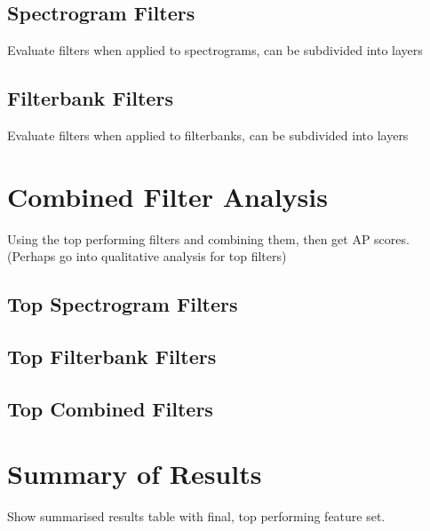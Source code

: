 \subsection{Spectrogram Filters}

Evaluate filters when applied to spectrograms, can be subdivided into layers

\subsection{Filterbank Filters}

Evaluate filters when applied to filterbanks, can be subdivided into layers

\section{Combined Filter Analysis}

Using the top performing filters and combining them, then get AP scores.
(Perhaps go into qualitative analysis for top filters)

\subsection{Top Spectrogram Filters}

\subsection{Top Filterbank Filters}

\subsection{Top Combined Filters}

\section{Summary of Results}

Show summarised results table with final, top performing feature set.